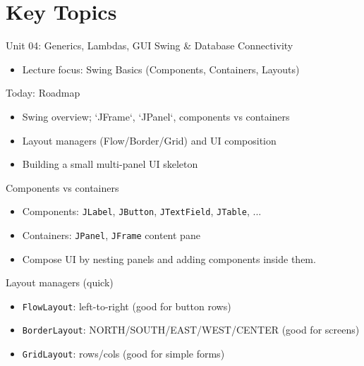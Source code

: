 \documentclass{beamer}
\begin{document}
\section{Key Topics}
\label{sec:concepts}

\begin{frame}{Unit 04: Generics, Lambdas, GUI Swing \& Database Connectivity}
  \begin{itemize}[<+->]
    \item Lecture focus: Swing Basics (Components, Containers, Layouts)
  \end{itemize}
  \slidesources{\OOPSUnitIVSources}
\end{frame}

\begin{frame}{Today: Roadmap}
  \begin{itemize}[<+->]
    \item Swing overview; `JFrame`, `JPanel`, components vs containers
    \item Layout managers (Flow/Border/Grid) and UI composition
    \item Building a small multi-panel UI skeleton
  \end{itemize}
  \slidesources{\OOPSUnitIVSources}
\end{frame}

\begin{frame}{Components vs containers}
  \begin{itemize}[<+->]
    \item Components: \texttt{JLabel}, \texttt{JButton}, \texttt{JTextField}, \texttt{JTable}, ...
    \item Containers: \texttt{JPanel}, \texttt{JFrame} content pane
    \item Compose UI by nesting panels and adding components inside them.
  \end{itemize}
  \slidesources{\OOPSUnitIVSources}
\end{frame}

\begin{frame}{Layout managers (quick)}
  \begin{itemize}[<+->]
    \item \texttt{FlowLayout}: left-to-right (good for button rows)
    \item \texttt{BorderLayout}: NORTH/SOUTH/EAST/WEST/CENTER (good for screens)
    \item \texttt{GridLayout}: rows/cols (good for simple forms)
  \end{itemize}
  \slidesources{\OOPSUnitIVSources}
\end{frame}
\end{document}
